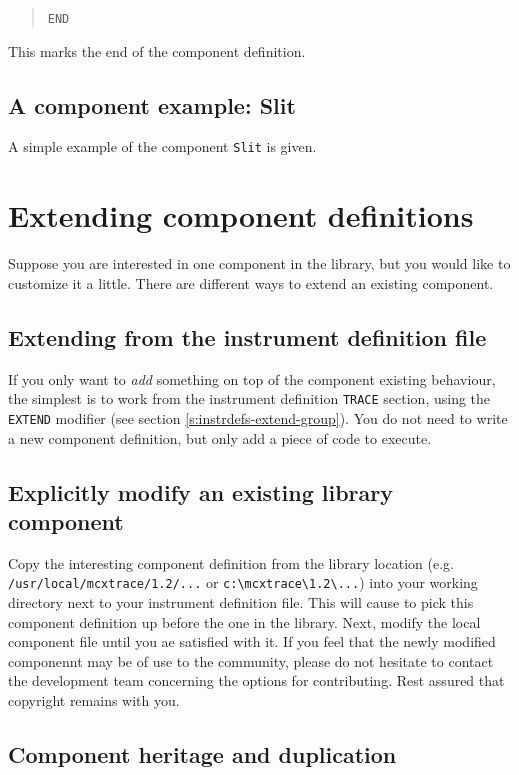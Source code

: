 \begin{quote}
  \texttt{END}
\end{quote}
This marks the end of the component definition.

\subsection{A component example: Slit}
\label{s:slit}
A simple example of the component \texttt{Slit} is given.


\section{Extending component definitions}
\label{s:compdefs-extend}

Suppose you are interested in one component in the \MCX library, but you would like to customize it a little. There are different ways to extend an existing component.

\subsection{Extending from the instrument definition file}

If you only want to \emph{add} something on top of the component existing behaviour, the simplest is to work from the instrument definition \texttt{TRACE} section, using the \texttt{EXTEND} modifier (see section \ref{s:instrdefs-extend-group}). You do not need to write a new component definition, but only add a piece of code to execute.

\subsection{Explicitly modify an existing library component}
Copy the interesting component definition from the \MCX library location (e.g. \verb+/usr/local/mcxtrace/1.2/...+ or \verb+c:\mcxtrace\1.2\...+) into your working directory next to
your instrument definition file. 
This will cause \MCX to pick this component definition up before the one in the library.
Next, modify the local component file until you ae satisfied with it. If you feel that the newly modified componennt may be of use to the \MCX community, please do not hesitate to contact the
development team concerning the options for contributing. Rest assured that copyright remains with you. 

\subsection{Component heritage and duplication}

